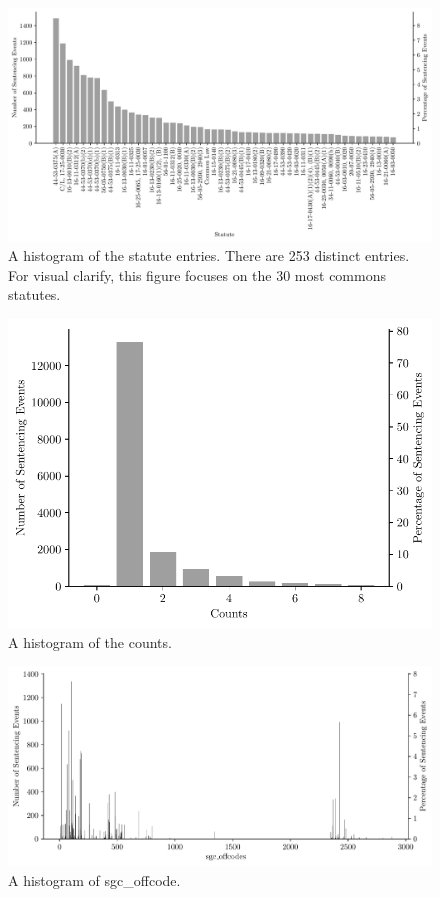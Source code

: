 \documentclass[11pt, oneside]{article}   	%
\theoremstyle{ModifiedStyle}
\begin{document}
%
\begin{figure}[h!]
	\centering
	\hspace*{-18mm}
	\includegraphics[scale=0.75]{Figures/statute_first_Histogram}
	\vspace{-2mm}
	\caption{A histogram of the statute entries. There are 253 distinct entries. For visual clarify, this figure focuses on the 30 most commons statutes.}
	\label{Figure_Statute_Histogram}
\end{figure}
%
\begin{figure}[h!]
	\centering
	\includegraphics[scale=0.75]{Figures/Count_Histogram}
	\caption{A histogram of the counts.}
	\label{Figure_Hester_Data_Counts_Histogram}
\end{figure}
%
\begin{figure}[h!]
	\centering
	\includegraphics[scale=0.75]{Figures/sgc_offcodes_Histogram}
	\vspace{-2mm}
	\caption{A histogram of sgc\_offcode.}
	\label{Figure_Hester_Data_sgc_offcode_Histogram}
\end{figure}
\end{document}

